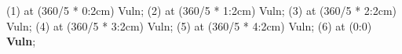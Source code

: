  (1) at (360/5 * 0:2cm) {\small Vuln};
 (2) at (360/5 * 1:2cm) {\small Vuln};
 (3) at (360/5 * 2:2cm) {\small Vuln};
 (4) at (360/5 * 3:2cm) {\small Vuln};
 (5) at (360/5 * 4:2cm) {\small Vuln};
 (6) at (0:0) {\textbf{\small Vuln}};

